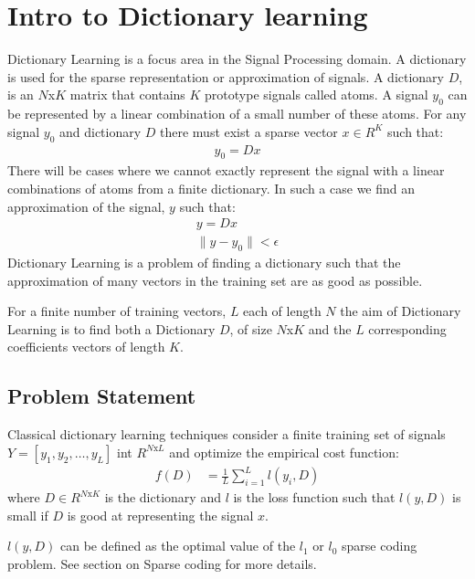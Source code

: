 \documentclass{article} %
\begin{document}
\section{Intro to Dictionary learning}
Dictionary Learning is a focus area in the Signal Processing domain. A dictionary is used for the sparse representation or approximation of signals. A dictionary $D$, is an $N$x$K$ matrix that contains $K$ prototype signals called atoms. A signal $y_0$ can be represented by a linear combination of a small number of these atoms. For any signal $y_0$ and dictionary $D$ there must exist a sparse vector $x \in R^K$ such that:
\begin{align}
y_0 = Dx
\end{align}   
There will be cases where we cannot exactly represent the signal with a linear combinations of atoms from a finite dictionary. In such a case we find an approximation of the signal, $y$ such that:
\begin{align}
y = Dx \\
\|y - y_0\| < \epsilon
\end{align} 
Dictionary Learning is a problem of finding a dictionary such that the approximation of many vectors in the training set are as good as possible. 

For a finite number of training vectors, $L$ each of length $N$ the aim of Dictionary Learning is to find both a Dictionary $D$, of size $N$x$K$ and the $L$ corresponding coefficients vectors of length $K$.

\subsection{Problem Statement}
Classical dictionary learning techniques consider a finite training set of signals $Y = [y_1, y_2, \ldots, y_L]$ int $R^{N\text{x}L}$ and optimize the empirical cost function:
\begin{align}
f(D) &= \frac{1}{L}\sum_{i=1}^{L}l(y_i, D)
\end{align} 
where $D \in R^{N\text{x}K}$ is the dictionary and $l$ is the loss function such that $l(y,D)$ is small if $D$ is good at representing the signal $x$. 

$l(y,D)$ can be defined as the optimal value of the $l_1$ or $l_0$ sparse coding problem. See section on Sparse coding for more details. 
\end{document}
